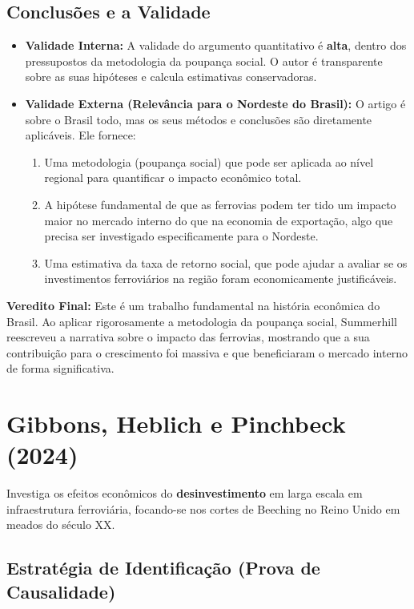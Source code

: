 \documentclass[12pt, a4paper]{article}
\begin{document}
\subsection{Conclusões e a Validade}
\begin{itemize}
    \item \textbf{Validade Interna:} A validade do argumento quantitativo é \textbf{alta}, dentro dos pressupostos da metodologia da poupança social. O autor é transparente sobre as suas hipóteses e calcula estimativas conservadoras.
    \item \textbf{Validade Externa (Relevância para o Nordeste do Brasil):} O artigo é sobre o Brasil todo, mas os seus métodos e conclusões são diretamente aplicáveis. Ele fornece:
        \begin{enumerate}
            \item Uma metodologia (poupança social) que pode ser aplicada ao nível regional para quantificar o impacto econômico total.
            \item A hipótese fundamental de que as ferrovias podem ter tido um impacto maior no mercado interno do que na economia de exportação, algo que precisa ser investigado especificamente para o Nordeste.
            \item Uma estimativa da taxa de retorno social, que pode ajudar a avaliar se os investimentos ferroviários na região foram economicamente justificáveis.
        \end{enumerate}
\end{itemize}

\noindent\textbf{Veredito Final:} Este é um trabalho fundamental na história econômica do Brasil. Ao aplicar rigorosamente a metodologia da poupança social, Summerhill reescreveu a narrativa sobre o impacto das ferrovias, mostrando que a sua contribuição para o crescimento foi massiva e que beneficiaram o mercado interno de forma significativa. 

\section{Gibbons, Heblich e Pinchbeck (2024)}
Investiga os efeitos econômicos do \textbf{desinvestimento} em larga escala em infraestrutura ferroviária, focando-se nos cortes de Beeching no Reino Unido em meados do século XX.

\subsection{Estratégia de Identificação (Prova de Causalidade)}
\end{document}
